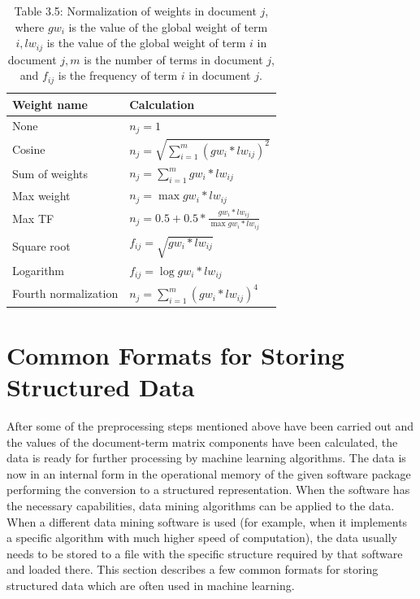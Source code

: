 \documentclass[11pt,openany,executivepaper]{book}
\begin{document}
\begin{table}[h!]
\begin{center}
\captionsetup{labelformat=empty}
\caption{Table 3.5: Normalization of weights in document $j$, where $gw_{i}$ is the value of the global weight of term $i, l w_{i j}$ is the value of the global weight of term $i$ in document $j, m$ is the number of terms in document $j$, and $f_{i j}$ is the frequency of term $i$ in document $j$.}
\begin{tabular}{|l|l|}
\hline
Weight name & Calculation \\
\hline
None & $n_{j}=1$ \\
\hline
Cosine & $n_{j}=\sqrt{\sum_{i=1}^{m}\left(g w_{i} * l w_{i j}\right)^{2}}$ \\
\hline
Sum of weights & $n_{j}=\sum_{i=1}^{m} g w_{i} * l w_{i j}$ \\
\hline
Max weight & $n_{j}=\max g w_{i} * l w_{i j}$ \\
\hline
Max TF & $n_{j}=0.5+0.5 * \frac{g w_{i} * l w_{i j}}{\max g w_{i} * l w_{i j}}$ \\
\hline
Square root & $f_{i j}=\sqrt{g w_{i} * l w_{i j}}$ \\
\hline
Logarithm & $f_{i j}=\log g w_{i} * l w_{i j}$ \\
\hline
Fourth normalization & $n_{j}=\sum_{i=1}^{m}\left(g w_{i} * l w_{i j}\right)^{4}$ \\
\hline
\end{tabular}
\end{center}
\end{table}

\section{Common Formats for Storing Structured Data}
After some of the preprocessing steps mentioned above have been carried out and the values of the document-term matrix components have been calculated, the data is ready for further processing by machine learning algorithms. The data is now in an internal form in the operational memory of the given software package performing the conversion to a structured representation. When the software has the necessary capabilities, data mining algorithms can be applied to the data. When a different data mining software is used (for example, when it implements a specific algorithm with much higher speed of computation), the data usually needs to be stored to a file with the specific structure required by that software and loaded there. This section describes a few common formats for storing structured data which are often used in machine learning.
\end{document}
